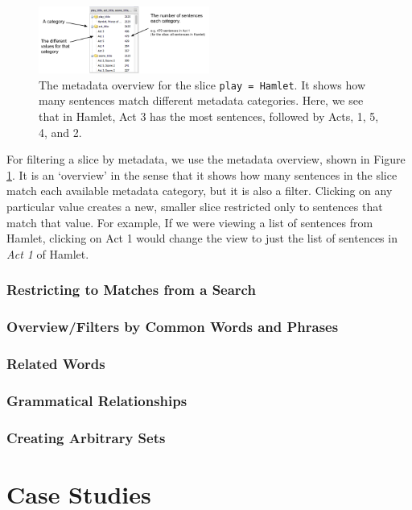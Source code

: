 \documentclass{sig-alternate}
\newcommand{\code}[1] {\texttt{#1}}
\begin{document}
\begin{figure}
\includegraphics[width=0.5\textwidth]{fig/sliding/02-metadata-categories.png}
\caption{The metadata overview for the slice \code{play = Hamlet}.  It shows how many sentences match different metadata categories. Here, we see that in Hamlet, Act 3 has the most sentences, followed by Acts, 1, 5, 4, and 2. \label{fig:metadata-categories}}
\end{figure}
For filtering a slice by metadata, we use the metadata overview, shown in Figure \ref{fig:metadata-categories}. It is an `overview' in the sense that it shows how many sentences in the slice match each available metadata category, but it is also a filter. Clicking on any particular value creates a new, smaller slice restricted only to sentences that match that value. For example, If we were viewing a list of sentences from Hamlet,  clicking on Act 1 would change the view to just the list of sentences in \emph{Act 1} of Hamlet.

\subsubsection{Restricting to Matches from a Search}


\subsubsection{Overview/Filters by Common Words and Phrases }


\subsubsection{Related Words}

\subsubsection{Grammatical Relationships}

\subsubsection {Creating Arbitrary Sets}

\section{Case Studies}
\end{document}

